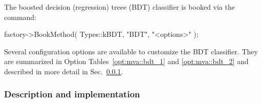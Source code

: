 The boosted decision (regression) treee (BDT) classifier is booked via the command:
\begin{codeexample}
\begin{tmvacode}
factory->BookMethod( Types::kBDT, "BDT", "<options>" );
\end{tmvacode}
\caption[.]{\codeexampleCaptionSize Booking of the BDT classifier: 
         the first argument is a predefined enumerator, the
         second argument is a user-defined string identifier, and the third
         argument is the configuration options string. 
         Individual options are separated by a ':'. See 
         Sec.~\ref{sec:usingtmva:booking} for more information on the booking.}
\end{codeexample}
\begin{option}[p]

\caption[.]{\optionCaptionSize Configuration options reference for MVA
  method: {\em BDT}.  Values given are defaults. If predefined
  categories exist, the default category is marked by a '$\star$'. The
  options in Option Table~\ref{opt:mva::methodbase} on
  page~\pageref{opt:mva::methodbase} can also be configured. The table
  is continued in Option Table~\ref{opt:mva::bdt_2}.  }
\label{opt:mva::bdt_1}
\end{option}

\begin{option}[p]

\caption[.]{\optionCaptionSize 
     Continuation of Option Table~\ref{opt:mva::bdt_1}.     
}
\label{opt:mva::bdt_2}
\end{option}

\begin{option}[p]

\caption[.]{\optionCaptionSize 
  Some deprecated options for the BDT
  Method that are for the moment still kept for compatibility.  }
\label{opt:mva::bdt_2}
\end{option}

Several configuration options are available to customize the BDT
classifier. They are summarized in Option Tables~\ref{opt:mva::bdt_1}
and \ref{opt:mva::bdt_2} and described in more detail in
Sec.~\ref{sec:bdt_descr}.

\subsubsection{Description and implementation}
\label{sec:bdt_descr}


